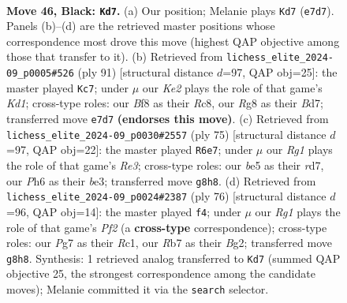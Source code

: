 \documentclass[11pt]{article}
\begin{document}
\clearpage

\begin{figure}[p]\centering
\begin{subfigure}{0.46\textwidth}\centering
\resizebox{\linewidth}{!}{%
\newchessgame
\chessboard[
  setfen={5br1/1r2k1p1/p1p4p/Pp1bBp2/2p4P/4P1P1/1P1K1P1N/R5R1 b - - 9 46},
  showmover=false,
  pgfstyle=straightmove, color=movearrow, markmove={e7-d7}
]}
\caption{}
\end{subfigure}\hfill
\begin{subfigure}{0.46\textwidth}\centering
\resizebox{\linewidth}{!}{%
\newchessgame
\chessboard[
  setfen={2rk2r1/3b1p2/4p1p1/1p1pP2p/pP3P2/P1PR2P1/4B2P/2KR4 b - - 32 46},
  showmover=false,
  pgfstyle=straightmove, color=movearrow, markmove={d8-c7}
]}
\caption{}
\end{subfigure}
\\[4pt]
\begin{subfigure}{0.46\textwidth}\centering
\resizebox{\linewidth}{!}{%
\newchessgame
\chessboard[
  setfen={4r3/3R2p1/2p1rbk1/p4p2/P3p1p1/2P1B1P1/1P1R1P2/5BK1 b - - 5 38},
  showmover=false,
  pgfstyle=straightmove, color=movearrow, markmove={e6-e7}
]}
\caption{}
\end{subfigure}\hfill
\begin{subfigure}{0.46\textwidth}\centering
\resizebox{\linewidth}{!}{%
\newchessgame
\chessboard[
  setfen={6k1/3r1p2/pB2p1pb/Pp5p/7P/2P3P1/bP3PB1/2R3K1 w - - 9 39},
  showmover=false,
  pgfstyle=straightmove, color=movearrow, markmove={f2-f4}
]}
\caption{}
\end{subfigure}
\caption{\textbf{Move 46, Black: \texttt{Kd7}.} (a) Our position; Melanie plays \texttt{Kd7} (\texttt{e7d7}). Panels (b)--(d) are the retrieved master positions whose correspondence most drove this move (highest QAP objective among those that transfer to it). (b) Retrieved from \texttt{lichess\_elite\_2024-09\_p0005\#526} (ply 91) [structural distance $d$=97, QAP obj=25]: the master played \texttt{Kc7}; under $\mu$ our \emph{Ke2} plays the role of that game's \emph{Kd1}; cross-type roles: our \emph{B}f8 as their \emph{R}c8, our \emph{R}g8 as their \emph{B}d7; transferred move \texttt{e7d7} \textbf{(endorses this move)}. (c) Retrieved from \texttt{lichess\_elite\_2024-09\_p0030\#2557} (ply 75) [structural distance $d$=97, QAP obj=22]: the master played \texttt{R6e7}; under $\mu$ our \emph{Rg1} plays the role of that game's \emph{Re3}; cross-type roles: our \emph{b}e5 as their \emph{r}d7, our \emph{P}h6 as their \emph{b}e3; transferred move \texttt{g8h8}. (d) Retrieved from \texttt{lichess\_elite\_2024-09\_p0024\#2387} (ply 76) [structural distance $d$=96, QAP obj=14]: the master played \texttt{f4}; under $\mu$ our \emph{Rg1} plays the role of that game's \emph{Pf2} (a \textbf{cross-type} correspondence); cross-type roles: our \emph{P}g7 as their \emph{R}c1, our \emph{R}b7 as their \emph{B}g2; transferred move \texttt{g8h8}. Synthesis: 1 retrieved analog transferred to \texttt{Kd7} (summed QAP objective 25, the strongest correspondence among the candidate moves); Melanie committed it via the \texttt{search} selector.}
\label{fig:thought-m91}
\end{figure}
\end{document}
